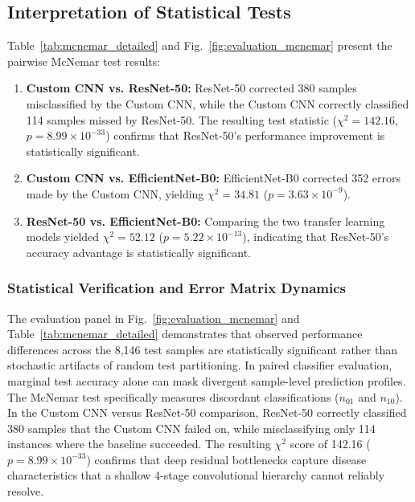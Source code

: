 \documentclass[journal]{IEEEtran}
\begin{document}
\subsection{Interpretation of Statistical Tests}
Table~\ref{tab:mcnemar_detailed} and Fig.~\ref{fig:evaluation_mcnemar} present the pairwise McNemar test results:
\begin{enumerate}
    \item \textbf{Custom CNN vs. ResNet-50:} ResNet-50 corrected 380 samples misclassified by the Custom CNN, while the Custom CNN correctly classified 114 samples missed by ResNet-50. The resulting test statistic ($\chi^2 = 142.16$, $p = 8.99 \times 10^{-33}$) confirms that ResNet-50's performance improvement is statistically significant.
    \item \textbf{Custom CNN vs. EfficientNet-B0:} EfficientNet-B0 corrected 352 errors made by the Custom CNN, yielding $\chi^2 = 34.81$ ($p = 3.63 \times 10^{-9}$).
    \item \textbf{ResNet-50 vs. EfficientNet-B0:} Comparing the two transfer learning models yielded $\chi^2 = 52.12$ ($p = 5.22 \times 10^{-13}$), indicating that ResNet-50's accuracy advantage is statistically significant.
\end{enumerate}

\subsubsection{Statistical Verification and Error Matrix Dynamics}
The evaluation panel in Fig.~\ref{fig:evaluation_mcnemar} and Table~\ref{tab:mcnemar_detailed} demonstrates that observed performance differences across the 8,146 test samples are statistically significant rather than stochastic artifacts of random test partitioning. In paired classifier evaluation, marginal test accuracy alone can mask divergent sample-level prediction profiles. The McNemar test specifically measures discordant classifications ($n_{01}$ and $n_{10}$). In the Custom CNN versus ResNet-50 comparison, ResNet-50 correctly classified 380 samples that the Custom CNN failed on, while misclassifying only 114 instances where the baseline succeeded. The resulting $\chi^2$ score of 142.16 ($p = 8.99 \times 10^{-33}$) confirms that deep residual bottlenecks capture disease characteristics that a shallow 4-stage convolutional hierarchy cannot reliably resolve.

\end{document}

